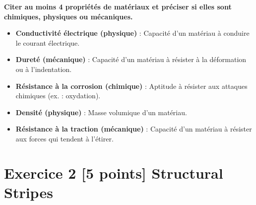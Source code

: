 \documentclass{exam}
\begin{document}
\begin{questions}
\question[1] \textbf{Citer au moins 4 propriétés de matériaux et préciser si elles sont chimiques, physiques ou mécaniques.}

\begin{itemize}
    \item \textbf{Conductivité électrique (physique)} : Capacité d'un matériau à conduire le courant électrique.
    \item \textbf{Dureté (mécanique)} : Capacité d'un matériau à résister à la déformation ou à l'indentation.
    \item \textbf{Résistance à la corrosion (chimique)} : Aptitude à résister aux attaques chimiques (ex. : oxydation).
    \item \textbf{Densité (physique)} : Masse volumique d'un matériau.
    \item \textbf{Résistance à la traction (mécanique)} : Capacité d'un matériau à résister aux forces qui tendent à l'étirer.
\end{itemize}

\end{questions}

\section*{Exercice 2 [5 points] Structural Stripes}
\end{document}
